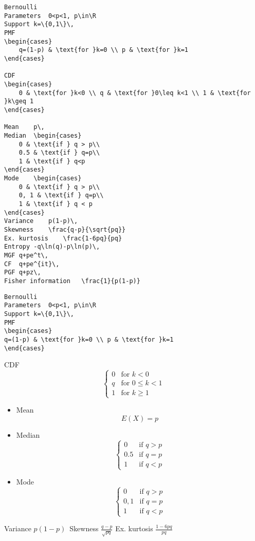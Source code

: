 \documentclass[]{report}
\begin{document}
\begin{verbatim}
Bernoulli
Parameters	0<p<1, p\in\R
Support	k=\{0,1\}\,
PMF	
\begin{cases}
	q=(1-p) & \text{for }k=0 \\ p & \text{for }k=1
\end{cases}

CDF	
\begin{cases}
	0 & \text{for }k<0 \\ q & \text{for }0\leq k<1 \\ 1 & \text{for }k\geq 1
\end{cases}

Mean	p\,
Median	\begin{cases}
	0 & \text{if } q > p\\
	0.5 & \text{if } q=p\\
	1 & \text{if } q<p
\end{cases}
Mode	\begin{cases}
	0 & \text{if } q > p\\
	0, 1 & \text{if } q=p\\
	1 & \text{if } q < p
\end{cases}
Variance	p(1-p)\,
Skewness	\frac{q-p}{\sqrt{pq}}
Ex. kurtosis	\frac{1-6pq}{pq}
Entropy	-q\ln(q)-p\ln(p)\,
MGF	q+pe^t\,
CF	q+pe^{it}\,
PGF	q+pz\,
Fisher information	 \frac{1}{p(1-p)} 
\end{verbatim}

\begin{verbatim}
Bernoulli
Parameters	0<p<1, p\in\R
Support	k=\{0,1\}\,
PMF	
\begin{cases}
q=(1-p) & \text{for }k=0 \\ p & \text{for }k=1
\end{cases}
\end{verbatim}

CDF	
\[\begin{cases}
0 & \text{for }k<0 \\ q & \text{for }0\leq k<1 \\ 1 & \text{for }k\geq 1
\end{cases}\]


\begin{itemize}
	\item Mean	\[E(X) = p \]
	\item Median \[	\begin{cases}
	0 & \text{if } q > p\\
	0.5 & \text{if } q=p\\
	1 & \text{if } q<p \end{cases}	\]
	
	\item Mode	\[\begin{cases}
	0 & \text{if } q > p\\
	0, 1 & \text{if } q=p\\
	1 & \text{if } q < p
	\end{cases}\]
\end{itemize}
Variance	$p(1-p)\,$
Skewness	$\frac{q-p}{\sqrt{pq}}$
Ex. kurtosis	$\frac{1-6pq}{pq}$
\end{document}
